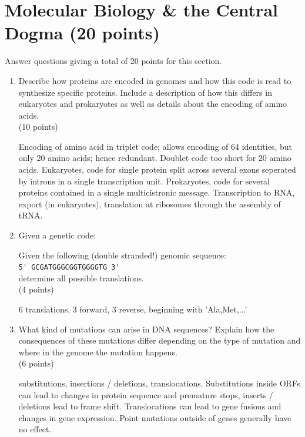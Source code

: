 \documentclass[11pt]{article}
\begin{document}
\section{Molecular Biology \& the Central Dogma (20 points)}
Answer questions giving a total of 20 points for this section.
\begin{enumerate}
\item Describe how proteins are encoded in genomes and how this code is read
  to synthesize specific proteins. Include a description of
  how this differs in eukaryotes and prokaryotes as well as details about the
  encoding of amino acids.\\
  (10 points)
\begin{Notes}
  Encoding of amino acid in triplet code; allows encoding of 64 identities,
  but only 20 amino acids; hence redundant. Doublet code too short for 20
  amino acids. Eukaryotes, code for single protein split across several exons
  seperated by introns in a single transcription unit. Prokaryotes, code for
  several proteins contained in a single multicistronic message.
  Transcription to RNA, export (in eukaryotes), translation at ribosomes
  through the assembly of tRNA.
\end{Notes}

\item Given a genetic code:\\
  \begin{minipage}{0.6\textwidth}
  {\tiny
    
  }
  \end{minipage}

  Given the following (double stranded!) genomic sequence:\\
  \verb|5' GCGATGGGCGGTGGGGTG 3'|\\
  determine all possible translations.\\
  (4 points)

\begin{Notes}
  6 translations, 3 forward, 3 reverse, beginning with 'Ala,Met,...'
\end{Notes}

\item What kind of mutations can arise in DNA sequences? Explain how the
  consequences of these mutations differ depending on the type of mutation and
  where in the genome the mutation happens.\\
  (6 points)

\begin{Notes}
  substitutions, insertions / deletions, translocations. Substitutions inside ORFs
  can lead to changes in protein sequence and premature stops, inserts /
  deletions lead to frame shift. Translocations can lead to gene fusions
  and changes in gene expression. Point mutations outside of genes generally
  have no effect.
\end{Notes}


\end{enumerate}
\end{document}
